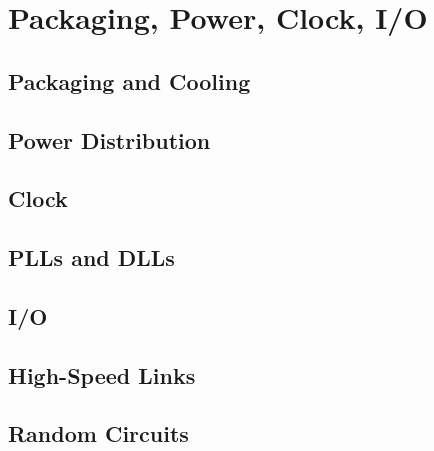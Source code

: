 \section{Packaging, Power, Clock, I/O}

\subsection{Packaging and Cooling}

\subsection{Power Distribution}

\subsection{Clock}

\subsection{PLLs and DLLs}

\subsection{I/O}

\subsection{High-Speed Links}

\subsection{Random Circuits}
